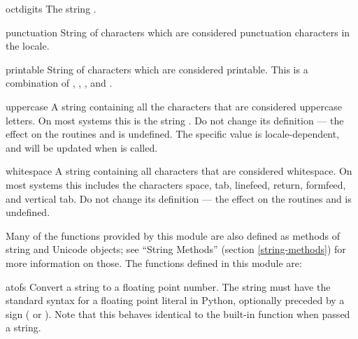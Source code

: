 \begin{datadesc}{octdigits}
  The string .
\end{datadesc}

\begin{datadesc}{punctuation}
  String of \ASCII{} characters which are considered punctuation
  characters in the  locale.
\end{datadesc}

\begin{datadesc}{printable}
  String of characters which are considered printable.  This is a
  combination of , ,
  , and .
\end{datadesc}

\begin{datadesc}{uppercase}
  A string containing all the characters that are considered uppercase
  letters.  On most systems this is the string
  .  Do not change its definition ---
  the effect on the routines  and
   is undefined.  The specific value is
  locale-dependent, and will be updated when
   is called.
\end{datadesc}

\begin{datadesc}{whitespace}
  A string containing all characters that are considered whitespace.
  On most systems this includes the characters space, tab, linefeed,
  return, formfeed, and vertical tab.  Do not change its definition ---
  the effect on the routines  and 
  is undefined.
\end{datadesc}


Many of the functions provided by this module are also defined as
methods of string and Unicode objects; see ``String Methods'' (section
\ref{string-methods}) for more information on those.
The functions defined in this module are:

\begin{funcdesc}{atof}{s}
  Convert a string to a floating point number.  The string must have
  the standard syntax for a floating point literal in Python,
  optionally preceded by a sign (\samp{+} or \samp{-}).  Note that
  this behaves identical to the built-in function
   when passed a string.

\end{funcdesc}

